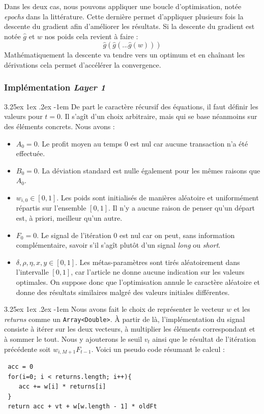 \documentclass[a4paper, 11pt]{article}
\makeatletter
\renewcommand\paragraph{\@startsection{paragraph}{5}{\z@}%
  {3.25ex \@plus1ex \@minus.2ex}%
  {-1em}%
  {\normalfont\normalsize\bfseries}}
\makeatother
\begin{document}
Dans les deux cas, nous pouvons appliquer une boucle d'optimisation, notée \textit{epochs} dans la littérature. Cette dernière permet d'appliquer plusieurs
fois la descente du gradient afin d'améliorer les résultats. Si la descente du gradient est notée $\widehat{g}$ et $w$ nos poids cela revient à faire :
$$\widehat{g}(\widehat{g}(...\widehat{g}(w)))$$
Mathématiquement la descente va tendre vers un optimum et en chaînant les dérivations cela permet d'accélérer la convergence.

\subsubsection{Implémentation \textit{Layer 1}}

\paragraph{}
De part le caractère récursif des équations, il faut définir les valeurs pour $t=0$. Il s'agît d'un choix arbitraire, mais qui se base néanmoins sur des
éléments concrets. Nous avons :
\begin{itemize}
 \item $A_0 = 0$. Le profit moyen au temps $0$ est nul car aucune transaction n'a été effectuée.
 \item $B_0 = 0$. La déviation standard est nulle également pour les mêmes raisons que $A_0$.
 \item $w_{i,0} \in [0,1]$. Les poids sont initialisés de manières aléatoire et uniformément répartis sur l'ensemble $[0,1]$. Il n'y a aucune raison
 de penser qu'un départ est, à priori, meilleur qu'un autre.
 \item $F_0 = 0$. Le signal de l'itération 0 est nul car on peut, sans information complémentaire, savoir s'il s'agît plutôt d'un signal \textit{long} ou
 \textit{short}.
 \item $\delta,\rho,\eta,x,y \in [0,1]$. Les métas-paramètres sont tirés aléatoirement dans l'intervalle $[0,1]$, car l'article ne donne aucune
 indication sur les valeurs optimales. On suppose donc que l'optimisation annule le caractère aléatoire et donne des résultats similaires malgré des
 valeurs initiales différentes.
\end{itemize}

\paragraph{}
Nous avons fait le choix de représenter le vecteur $w$ et les \textit{returns} comme un \texttt{Array<Double>}. À partir de là, l'implémentation du signal
consiste à itérer sur les deux vecteurs, à multiplier les éléments correspondant et à sommer le tout. Nous y ajouterons le seuil $v_t$ ainsi que le 
résultat de l'itération précédente soit $w_{i,M+1} F_{t-1}$.
Voici un pseudo code résumant le calcul :
\begin{lstlisting}
 acc = 0
 for(i=0; i < returns.length; i++){
    acc += w[i] * returns[i]
 }
 return acc + vt + w[w.length - 1] * oldFt
\end{lstlisting}
\end{document}
